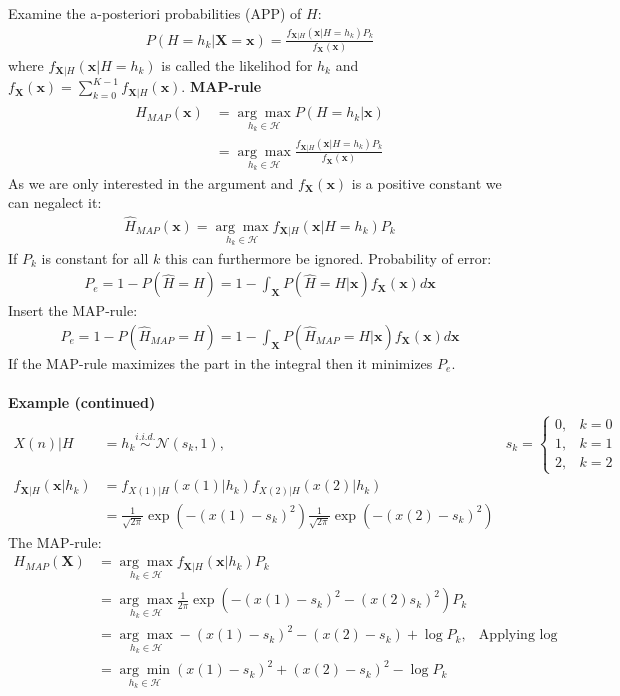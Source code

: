 \documentclass[12pt,a4paper]{report}
\begin{document}
Examine the a-posteriori probabilities (APP) of $H$:
\begin{align*}
P(H=h_k|\mathbf{X}=\mathbf{x})=\frac{f_{\mathbf{X}|H}(\mathbf{x}|H=h_k)P_k}{f_{\mathbf{X}}(\mathbf{x})}
\end{align*}
where $f_{\mathbf{X}|H}(\mathbf{x}|H=h_k)$ is called the likelihod for $h_k$ and $f_{\mathbf{X}}(\mathbf{x})=\sum_{k=0}^{K-1}f_{\mathbf{X}|H}(\mathbf{x})$.
\textbf{MAP-rule}\\
\begin{align*}
\hat{H}_{MAP}(\mathbf{x})&=\underset{h_k\in\mathcal{H}}{\arg\max} P(H=h_k|\mathbf{x})\\
&=\underset{h_k\in\mathcal{H}}{\arg\max}\frac{f_{\mathbf{X}|H}(\mathbf{x}|H=h_k)P_k}{f_{\mathbf{X}}(\mathbf{x})}
\end{align*}
As we are only interested in the argument and $f_{\mathbf{X}}(\mathbf{x})$ is a positive constant we can negalect it:
\begin{align*}
\hat{H}_{MAP}(\mathbf{x})=\underset{h_k\in\mathcal{H}}{\arg\max}f_{\mathbf{X}|H}(\mathbf{x}|H=h_k)P_k
\end{align*}
If $P_k$ is constant for all $k$ this can furthermore be ignored.
Probability of error:
\begin{align*}
P_e=1-P(\hat{H}=H)=1-\int_{\mathbf{X}}P(\hat{H}=H|\mathbf{x})f_{\mathbf{X}}(\mathbf{x})d\mathbf{x}
\end{align*}
Insert the MAP-rule:
\begin{align*}
P_e=1-P(\hat{H}_{MAP}=H)=1-\int_{\mathbf{X}}P(\hat{H}_{MAP}=H|\mathbf{x})f_{\mathbf{X}}(\mathbf{x})d\mathbf{x}
\end{align*}
If the MAP-rule maximizes the part in the integral then it minimizes $P_e$.\\\\
\textbf{Example (continued)}
\begin{align*}
X(n)|H&=h_k\overset{i.i.d.}\sim\mathcal{N}(s_k,1),&s_k=\begin{cases}0,&k=0\\1,&k=1\\2,&k=2\end{cases}\\
f_{\mathbf{X}|H}(\mathbf{x}|h_k)&=f_{X(1)|H}(x(1)|h_k)f_{X(2)|H}(x(2)|h_k)\\
&=\frac{1}{\sqrt{2\pi}}\exp\left(-(x(1)-s_k)^2\right)\frac{1}{\sqrt{2\pi}}\exp\left(-(x(2)-s_k)^2\right)
\end{align*}
The MAP-rule:
\begin{align*}
H_{MAP}(\mathbf{X})&=\underset{h_k\in\mathcal{H}}{\arg\max}f_{\mathbf{X}|H}(\mathbf{x}|h_k)P_k\\
&=\underset{h_k\in\mathcal{H}}{\arg\max}\frac{1}{2\pi}\exp\left(-(x(1)-s_k)^2-(x(2)s_k)^2\right)P_k\\
&=\underset{h_k\in\mathcal{H}}{\arg\max}-(x(1)-s_k)^2-(x(2)-s_k)+\log P_k,&\text{Applying }\log\\
&=\underset{h_k\in\mathcal{H}}{\arg\min}(x(1)-s_k)^2+(x(2)-s_k)^2-\log P_k
\end{align*}
\end{document}
